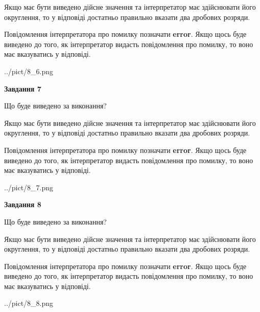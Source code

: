 \documentclass[12pt, ukrainian]{article}
\begin{document}
{\begin {Large}
Якщо має бути виведено дійсне значення та інтерпретатор має здійснювати його округлення, 
то у відповіді достатньо правильно вказати два дробових розряди.

Повідомлення інтерпретатора про помилку позначати \textbf{error}.
Якщо щось буде виведено до того, як інтерпретатор видасть повідомлення про помилку, 
то воно має вказуватись у відповіді. \par

\begin{center}
	{../pict/8_6.png}
\end{center}
\newpage

{\begin {center}\textbf{Завдання 7}\end {center}}\par
Що буде виведено за виконання? \par

Якщо має бути виведено дійсне значення та інтерпретатор має здійснювати його округлення, 
то у відповіді достатньо правильно вказати два дробових розряди.

Повідомлення інтерпретатора про помилку позначати \textbf{error}.
Якщо щось буде виведено до того, як інтерпретатор видасть повідомлення про помилку, 
то воно має вказуватись у відповіді. \par

\begin{center}
	{../pict/8_7.png}
\end{center}
\newpage

{\begin {center}\textbf{Завдання 8}\end {center}}\par
Що буде виведено за виконання? \par

Якщо має бути виведено дійсне значення та інтерпретатор має здійснювати його округлення, 
то у відповіді достатньо правильно вказати два дробових розряди.

Повідомлення інтерпретатора про помилку позначати \textbf{error}.
Якщо щось буде виведено до того, як інтерпретатор видасть повідомлення про помилку, 
то воно має вказуватись у відповіді. \par

\begin{center}
	{../pict/8_8.png}
\end{center}
\newpage


\end{Large}}
\end{document}
